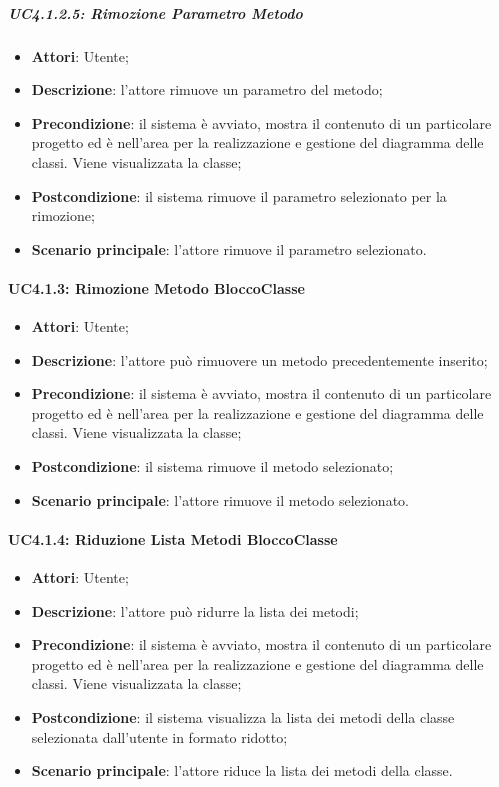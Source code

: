 \subparagraph{UC4.1.2.5: Rimozione Parametro Metodo}
\label{UC4.1.2.5}
\begin{itemize}
	\item \textbf{Attori}: Utente;
	\item \textbf{Descrizione}: l'attore rimuove un parametro del metodo;
	\item \textbf{Precondizione}: il sistema è avviato, mostra il contenuto di un particolare progetto ed è nell'area per la realizzazione e gestione del diagramma delle classi. Viene visualizzata la classe;
	\item \textbf{Postcondizione}: il sistema rimuove il parametro selezionato per la rimozione;
	\item \textbf{Scenario principale}: l'attore rimuove il parametro selezionato.
\end{itemize}

\paragraph{UC4.1.3: Rimozione Metodo BloccoClasse}
\label{UC4.1.3}
\begin{itemize}
	\item \textbf{Attori}: Utente;
	\item \textbf{Descrizione}: l'attore può rimuovere un metodo precedentemente inserito;
	\item \textbf{Precondizione}: il sistema è avviato, mostra il contenuto di un particolare progetto ed è nell'area per la realizzazione e gestione del diagramma delle classi. Viene visualizzata la classe;
	\item \textbf{Postcondizione}: il sistema rimuove il metodo selezionato;
	\item \textbf{Scenario principale}: l'attore rimuove il metodo selezionato.
\end{itemize}

\paragraph{UC4.1.4: Riduzione Lista Metodi BloccoClasse}
\label{UC4.1.4}
\begin{itemize}
	\item \textbf{Attori}: Utente;
	\item \textbf{Descrizione}: l'attore può ridurre la lista dei metodi;
	\item \textbf{Precondizione}: il sistema è avviato, mostra il contenuto di un particolare progetto ed è nell'area per la realizzazione e gestione del diagramma delle classi. Viene visualizzata la classe;
	\item \textbf{Postcondizione}: il sistema visualizza la lista dei metodi della classe selezionata dall'utente in formato ridotto;
	\item \textbf{Scenario principale}: l'attore riduce la lista dei metodi della classe.
\end{itemize}

